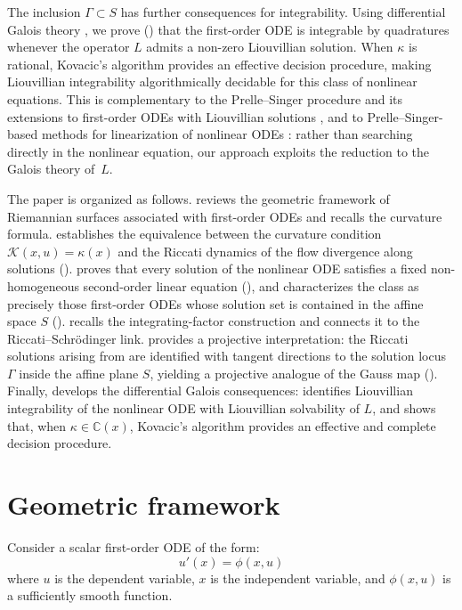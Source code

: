 \documentclass[preprint,a4paper]{elsarticle}
\begin{document}
The inclusion $\Gamma\subset S$ has further consequences for integrability. Using differential Galois theory \cite{vanderPutSinger2003, Singer1981}, we prove () that the first-order ODE is integrable by quadratures whenever the operator $L$ admits a non-zero Liouvillian solution. When $\kappa$ is rational, Kovacic's algorithm \cite{Kovacic1986} provides an effective decision procedure, making Liouvillian integrability algorithmically decidable for this class of nonlinear equations.
This is complementary to the Prelle--Singer procedure \cite{PrelleSinger1983} and its extensions to first-order ODEs with Liouvillian solutions \cite{DuarteDuarteMota2002a,DuarteDuarteMota2002b}, and to Prelle--Singer-based methods for linearization of nonlinear ODEs \cite{ChandrasekharEtAl2005}: rather than searching directly in the nonlinear equation, our approach exploits the reduction to the Galois theory of~$L$.

The paper is organized as follows.  reviews the geometric framework of Riemannian surfaces associated with first-order ODEs and recalls the curvature formula.  establishes the equivalence between the curvature condition $\mathcal{K}(x,u)=\kappa(x)$ and the Riccati dynamics of the flow divergence along solutions ().  proves that every solution of the nonlinear ODE satisfies a fixed non-homogeneous second-order linear equation (), and characterizes the class as precisely those first-order ODEs whose solution set is contained in the affine space $S$ ().  recalls the integrating-factor construction and connects it to the Riccati--Schrödinger link.  provides a projective interpretation: the Riccati solutions arising from  are identified with tangent directions to the solution locus $\Gamma$ inside the affine plane $S$, yielding a projective analogue of the Gauss map (). Finally,  develops the differential Galois consequences:  identifies Liouvillian integrability of the nonlinear ODE with Liouvillian solvability of $L$, and shows that, when $\kappa\in\mathbb{C}(x)$, Kovacic's algorithm provides an effective and complete decision procedure.




\section{Geometric framework}\label{preliminaries}
Consider a scalar first-order ODE of the form:
\begin{equation} \label{eq:ode1}
    u'(x) = \phi(x, u)
\end{equation}
where $u$ is the dependent variable, $x$ is the independent variable, and $\phi(x, u)$ is a sufficiently smooth function.
\end{document}
